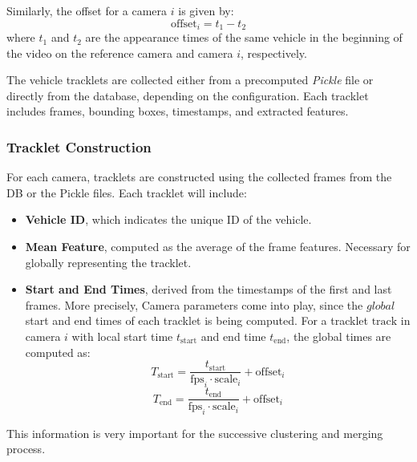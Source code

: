 Similarly, the offset for a camera \(i\) is given by:
\[
    \text{offset}_i = t_{1} - t_{2}
\]
where \(t_{1}\) and \(t_{2}\) are the appearance times of the same vehicle in the beginning of the video on the reference camera and camera \(i\), respectively.

The vehicle tracklets are collected either from a precomputed \textit{Pickle} file or directly from the database, depending on the configuration. Each tracklet includes frames, bounding boxes, timestamps, and extracted features.

\subsubsection{Tracklet Construction}
For each camera, tracklets are constructed using the collected frames from the DB or the Pickle files.
Each tracklet will include:
\begin{itemize}
    \item \textbf{Vehicle ID}, which indicates the unique ID of the vehicle.
    \item \textbf{Mean Feature}, computed as the average of the frame features. Necessary for globally representing the tracklet.
    \item \textbf{Start and End Times}, derived from the timestamps of the first and last frames. More precisely, Camera parameters come into play, since the $\textit{global}$ start and end times of each tracklet is being computed. For a tracklet \( \text{track} \) in camera \(i\) with local start time \(t_{\text{start}}\) and end time \(t_{\text{end}}\), the global times are computed as:
    \[
    T_{\text{start}} = \frac{t_{\text{start}}}{\text{fps}_i \cdot \text{scale}_i} + \text{offset}_i
    \]
    \[
    T_{\text{end}} = \frac{t_{\text{end}}}{\text{fps}_i \cdot \text{scale}_i} + \text{offset}_i
    \]
\end{itemize}
This information is very important for the successive clustering and merging process.

